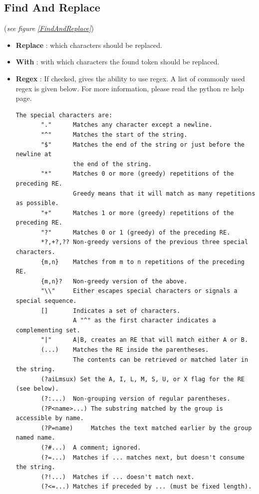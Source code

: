 \documentclass[10pt, a4paper]{scrartcl}
\begin{document}
\subsection*{Find And Replace}
(\emph{see figure \ref{FindAndReplace}})\\
\begin{itemize}
        \item \textbf{Replace} : which characters should be replaced.
        \item \textbf{With} : with which characters the found token should be replaced.
        \item \textbf{Regex} : If checked, gives the ability to use regex. A list of commonly used regex is given below. For more information, please read the python re help page.
                \begingroup
                \fontsize{8pt}{8pt}\selectfont
\begin{verbatim}
The special characters are:
       "."      Matches any character except a newline.
       "^"      Matches the start of the string.
       "$"      Matches the end of the string or just before the newline at
                the end of the string.
       "*"      Matches 0 or more (greedy) repetitions of the preceding RE.
                Greedy means that it will match as many repetitions as possible.
       "+"      Matches 1 or more (greedy) repetitions of the preceding RE.
       "?"      Matches 0 or 1 (greedy) of the preceding RE.
       *?,+?,?? Non-greedy versions of the previous three special characters.
       {m,n}    Matches from m to n repetitions of the preceding RE.
       {m,n}?   Non-greedy version of the above.
       "\\"     Either escapes special characters or signals a special sequence.
       []       Indicates a set of characters.
                A "^" as the first character indicates a complementing set.
       "|"      A|B, creates an RE that will match either A or B.
       (...)    Matches the RE inside the parentheses.
                The contents can be retrieved or matched later in the string.
       (?aiLmsux) Set the A, I, L, M, S, U, or X flag for the RE (see below).
       (?:...)  Non-grouping version of regular parentheses.
       (?P<name>...) The substring matched by the group is accessible by name.
       (?P=name)     Matches the text matched earlier by the group named name.
       (?#...)  A comment; ignored.
       (?=...)  Matches if ... matches next, but doesn't consume the string.
       (?!...)  Matches if ... doesn't match next.
       (?<=...) Matches if preceded by ... (must be fixed length).

\end{verbatim}
\end{itemize}
\end{document}
